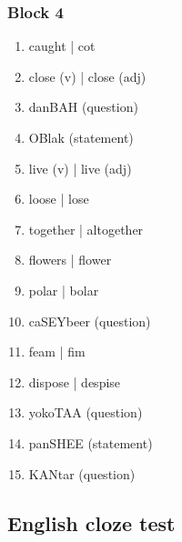 \documentclass[a4paper]{article}
\begin{document}
\subsubsection{Block 4}
\begin{enumerate}

  \item caught | cot
  \item close (v) | close (adj)
\item danBAH (question)
\item OBlak (statement)
  \item live (v) | live (adj)
  \item loose | lose
  \item together | altogether
  \item flowers | flower
  \item polar | bolar
\item caSEYbeer (question)
  \item feam | fim
  \item dispose | despise
\item yokoTAA (question)
\item panSHEE (statement)
\item KANtar (question)
\end{enumerate}
%
\subsection{English cloze test}
\end{document}
